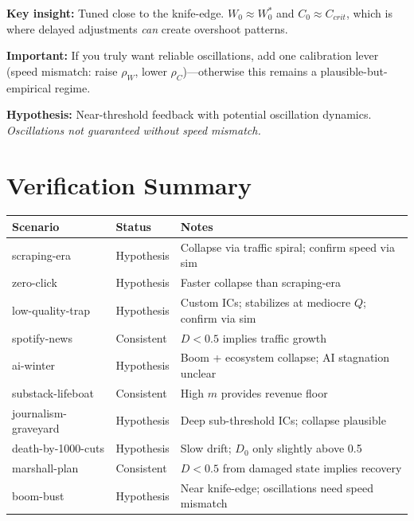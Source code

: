\documentclass[11pt]{article}
\begin{document}
\textbf{Key insight:} Tuned close to the knife-edge. $W_0 \approx W_0^*$ and $C_0 \approx C_{crit}$, which is where delayed adjustments \textit{can} create overshoot patterns.

\textbf{Important:} If you truly want reliable oscillations, add one calibration lever (speed mismatch: raise $\rho_W$, lower $\rho_C$)---otherwise this remains a plausible-but-empirical regime.

\textcolor{myorange}{\textbf{Hypothesis:}} Near-threshold feedback with potential oscillation dynamics. \textit{Oscillations not guaranteed without speed mismatch.}

\section{Verification Summary}

\begin{center}
\begin{tabular}{lll}
\toprule
\textbf{Scenario} & \textbf{Status} & \textbf{Notes} \\
\midrule
scraping-era & \textcolor{myorange}{Hypothesis} & Collapse via traffic spiral; confirm speed via sim \\
zero-click & \textcolor{myorange}{Hypothesis} & Faster collapse than scraping-era \\
low-quality-trap & \textcolor{myorange}{Hypothesis} & Custom ICs; stabilizes at mediocre $Q$; confirm via sim \\
spotify-news & \textcolor{mygreen}{Consistent} & $D < 0.5$ implies traffic growth \\
ai-winter & \textcolor{myorange}{Hypothesis} & Boom + ecosystem collapse; AI stagnation unclear \\
substack-lifeboat & \textcolor{mygreen}{Consistent} & High $m$ provides revenue floor \\
journalism-graveyard & \textcolor{myorange}{Hypothesis} & Deep sub-threshold ICs; collapse plausible \\
death-by-1000-cuts & \textcolor{myorange}{Hypothesis} & Slow drift; $D_0$ only slightly above 0.5 \\
marshall-plan & \textcolor{mygreen}{Consistent} & $D < 0.5$ from damaged state implies recovery \\
boom-bust & \textcolor{myorange}{Hypothesis} & Near knife-edge; oscillations need speed mismatch \\
\bottomrule
\end{tabular}
\end{center}
\end{document}
